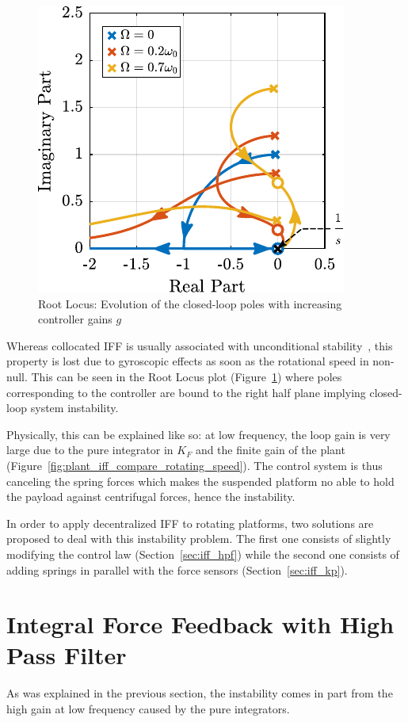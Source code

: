 \documentclass[10pt]{iopart}
\begin{document}
\begin{figure}[htbp]
\centering
\includegraphics[scale=1,scale=1]{figs/fig07.pdf}
\caption{\label{fig:root_locus_pure_iff}Root Locus: Evolution of the closed-loop poles with increasing controller gains \(g\)}
\end{figure}

Whereas collocated IFF is usually associated with unconditional stability~\cite{preumont91_activ}, this property is lost due to gyroscopic effects as soon as the rotational speed in non-null.
This can be seen in the Root Locus plot (Figure~\ref{fig:root_locus_pure_iff}) where poles corresponding to the controller are bound to the right half plane implying closed-loop system instability.

Physically, this can be explained like so: at low frequency, the loop gain is very large due to the pure integrator in \(K_{F}\) and the finite gain of the plant (Figure~\ref{fig:plant_iff_compare_rotating_speed}).
The control system is thus canceling the spring forces which makes the suspended platform no able to hold the payload against centrifugal forces, hence the instability.

In order to apply decentralized IFF to rotating platforms, two solutions are proposed to deal with this instability problem.
The first one consists of slightly modifying the control law (Section~\ref{sec:iff_hpf}) while the second one consists of adding springs in parallel with the force sensors (Section~\ref{sec:iff_kp}).

\section{Integral Force Feedback with High Pass Filter}
\label{sec:orgdb88ec7}
\label{sec:iff_hpf}
As was explained in the previous section, the instability comes in part from the high gain at low frequency caused by the pure integrators.
\end{document}
